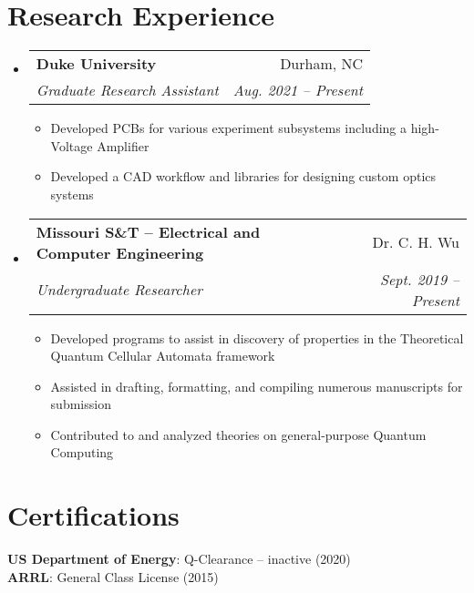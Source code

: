 \documentclass[letterpaper,11pt]{article}
\makeatletter
\newcommand{\resumeItem}[1]{
  \item\small{
    {#1 \vspace{-2pt}}
  }
}
\newcommand{\resumeSubheading}[4]{
  \vspace{-2pt}\item
    \begin{tabular*}{0.97\textwidth}[t]{l@{\extracolsep{\fill}}r}
      \textbf{#1} & #2 \\
      \textit{\small#3} & \textit{\small #4} \\
    \end{tabular*}\vspace{-7pt}
}
\newcommand{\resumeProjectHeading}[2]{
    \item
    \begin{tabular*}{0.97\textwidth}{l@{\extracolsep{\fill}}r}
      \small#1 & #2 \\
    \end{tabular*}\vspace{-7pt}
}
\newcommand{\resumeSubHeadingListStart}{\begin{itemize}[leftmargin=0.15in, label={}]}
\newcommand{\resumeSubHeadingListEnd}{\end{itemize}}
\newcommand{\resumeItemListStart}{\begin{itemize}}
\newcommand{\resumeItemListEnd}{\end{itemize}\vspace{-5pt}}
\makeatother
\begin{document}
\section{Research Experience}
\resumeSubHeadingListStart
    \resumeSubheading
      {Duke University}{Durham, NC}
      {Graduate Research Assistant}{Aug. 2021 -- Present}
      \resumeItemListStart
        \resumeItem{Developed PCBs for various experiment subsystems including a high-Voltage Amplifier}
        \resumeItem{Developed a CAD workflow and libraries for designing custom optics systems}
      \resumeItemListEnd
      
	\resumeSubheading
		{Missouri S\&T -- Electrical and Computer Engineering}{Dr. C. H. Wu}
		{Undergraduate Researcher}{Sept. 2019 -- Present}
		\resumeItemListStart
		\resumeItem{Developed programs to assist in discovery of properties in the Theoretical Quantum Cellular Automata framework}
		\resumeItem{Assisted in drafting, formatting, and compiling numerous manuscripts for submission}
		\resumeItem{Contributed to and analyzed theories on general-purpose Quantum Computing}
		\resumeItemListEnd
\resumeSubHeadingListEnd

\section{Certifications}
\begin{itemize}[leftmargin=0.15in, label={}]
	\small{\item{
			\textbf{US Department of Energy}{: Q-Clearance -- inactive (2020)}\\
			\textbf{ARRL}{: General Class License (2015)}	
	}}
\end{itemize}

\begin{comment}
\section{Projects}
    \resumeSubHeadingListStart
      \resumeProjectHeading
          {\textbf{Gitlytics} $|$ \emph{Python, Flask, React, PostgreSQL, Docker}}{June 2020 -- Present}
          \resumeItemListStart
            \resumeItem{Developed a full-stack web application using with Flask serving a REST API with React as the frontend}
            \resumeItem{Implemented GitHub OAuth to get data from user’s repositories}
            \resumeItem{Visualized GitHub data to show collaboration}
            \resumeItem{Used Celery and Redis for asynchronous tasks}
          \resumeItemListEnd
    \resumeSubHeadingListEnd
\end{comment}
\end{document}
